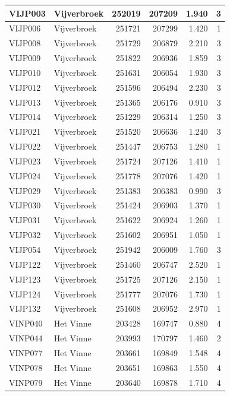 \documentclass[11pt,]{book}
\begin{document}
\begin{table}
\begin{tabular}[t]{l|l|r|r|r|r}
\hline
VIJP003 & Vijverbroek & 252019 & 207209 & 1.940 & 3\\
\hline
VIJP006 & Vijverbroek & 251721 & 207299 & 1.420 & 1\\
\hline
VIJP008 & Vijverbroek & 251729 & 206879 & 2.210 & 3\\
\hline
VIJP009 & Vijverbroek & 251822 & 206936 & 1.859 & 3\\
\hline
VIJP010 & Vijverbroek & 251631 & 206054 & 1.930 & 3\\
\hline
VIJP012 & Vijverbroek & 251596 & 206494 & 2.230 & 3\\
\hline
VIJP013 & Vijverbroek & 251365 & 206176 & 0.910 & 3\\
\hline
VIJP014 & Vijverbroek & 251229 & 206314 & 1.250 & 3\\
\hline
VIJP021 & Vijverbroek & 251520 & 206636 & 1.240 & 3\\
\hline
VIJP022 & Vijverbroek & 251447 & 206753 & 1.280 & 1\\
\hline
VIJP023 & Vijverbroek & 251724 & 207126 & 1.410 & 1\\
\hline
VIJP024 & Vijverbroek & 251778 & 207076 & 1.420 & 1\\
\hline
VIJP029 & Vijverbroek & 251383 & 206383 & 0.990 & 3\\
\hline
VIJP030 & Vijverbroek & 251424 & 206903 & 1.370 & 1\\
\hline
VIJP031 & Vijverbroek & 251622 & 206924 & 1.260 & 1\\
\hline
VIJP032 & Vijverbroek & 251602 & 206951 & 1.050 & 1\\
\hline
VIJP054 & Vijverbroek & 251942 & 206009 & 1.760 & 3\\
\hline
VIJP122 & Vijverbroek & 251460 & 206747 & 2.520 & 1\\
\hline
VIJP123 & Vijverbroek & 251725 & 207126 & 2.150 & 1\\
\hline
VIJP124 & Vijverbroek & 251777 & 207076 & 1.730 & 1\\
\hline
VIJP132 & Vijverbroek & 251608 & 206952 & 2.970 & 1\\
\hline
VINP040 & Het Vinne & 203428 & 169747 & 0.880 & 4\\
\hline
VINP044 & Het Vinne & 203993 & 170797 & 1.460 & 2\\
\hline
VINP077 & Het Vinne & 203661 & 169849 & 1.548 & 4\\
\hline
VINP078 & Het Vinne & 203651 & 169863 & 1.550 & 4\\
\hline
VINP079 & Het Vinne & 203640 & 169878 & 1.710 & 4\\

\end{tabular}
\end{table}
\end{document}
